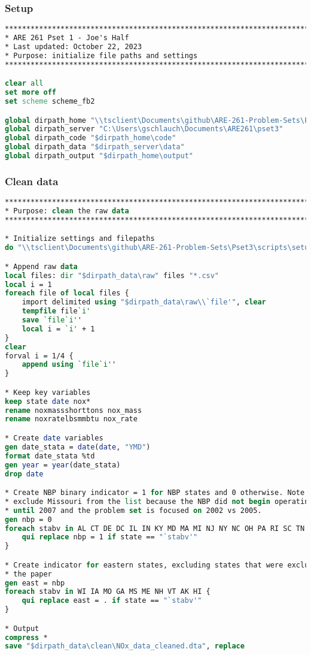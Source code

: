 \documentclass[12pt]{article}
\begin{document}
\subsubsection*{Setup}
\footnotesize
\begin{lstlisting}[language=Stata, numbers=none]
********************************************************************************
* ARE 261 Pset 1 - Joe's Half
* Last updated: October 22, 2023
* Purpose: initialize file paths and settings
********************************************************************************

clear all
set more off
set scheme scheme_fb2

global dirpath_home "\\tsclient\Documents\github\ARE-261-Problem-Sets\Pset3"
global dirpath_server "C:\Users\gschlauch\Documents\ARE261\pset3"
global dirpath_code "$dirpath_home\code"
global dirpath_data "$dirpath_server\data"
global dirpath_output "$dirpath_home\output"
\end{lstlisting}

\subsubsection*{Clean data}
\begin{lstlisting}[language=Stata, numbers=none]
********************************************************************************
* Purpose: clean the raw data
********************************************************************************

* Initialize settings and filepaths
do "\\tsclient\Documents\github\ARE-261-Problem-Sets\Pset3\scripts\setup.do"

* Append raw data
local files: dir "$dirpath_data\raw" files "*.csv"
local i = 1
foreach file of local files {
	import delimited using "$dirpath_data\raw\\`file'", clear
	tempfile file`i'
	save `file`i''
	local i = `i' + 1
}
clear
forval i = 1/4 {
	append using `file`i''
}

* Keep key variables
keep state date nox* 
rename noxmassshorttons nox_mass
rename noxratelbsmmbtu nox_rate

* Create date variables
gen date_stata = date(date, "YMD")
format date_stata %td
gen year = year(date_stata)
drop date

* Create NBP binary indicator = 1 for NBP states and 0 otherwise. Note that I 
* exclude Missouri from the list because the NBP did not begin operating there
* until 2007 and the problem set is focused on 2002 vs 2005.
gen nbp = 0 
foreach stabv in AL CT DE DC IL IN KY MD MA MI NJ NY NC OH PA RI SC TN VA WV {
	qui replace nbp = 1 if state == "`stabv'"
}

* Create indicator for eastern states, excluding states that were excluded in
* the paper
gen east = nbp
foreach stabv in WI IA MO GA MS ME NH VT AK HI {
	qui replace east = . if state == "`stabv'"
}

* Output
compress *
save "$dirpath_data\clean\NOx_data_cleaned.dta", replace
\end{lstlisting}
\end{document}
